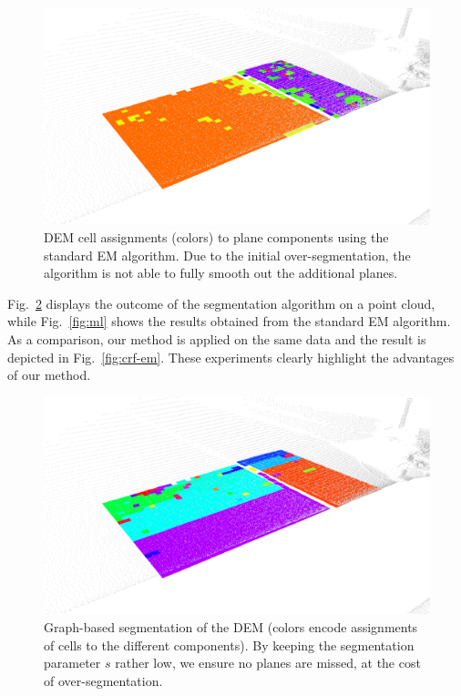 \begin{figure}[t]
\centering
\includegraphics[width=\columnwidth]{fig/ml.eps}
\caption{DEM cell assignments (colors) to plane components using the standard
EM algorithm. Due to the initial over-segmentation, the algorithm is not able
to fully smooth out the additional planes.}
\label{fig:complex}
\end{figure}

Fig.~\ref{fig:segment} displays the outcome of the segmentation algorithm on a
point cloud, while Fig.~\ref{fig:ml} shows the results obtained from the
standard EM algorithm. As a comparison, our method is applied on the same data
and the result is depicted in Fig.~\ref{fig:crf-em}. These experiments clearly
highlight the advantages of our method.

\begin{figure}[t]
\centering
\includegraphics[width=\columnwidth]{fig/segment.eps}
\caption{Graph-based segmentation of the DEM (colors encode assignments of
cells to the different components). By keeping the segmentation parameter $s$
rather low, we ensure no planes are missed, at the cost of over-segmentation.}
\label{fig:segment}
\end{figure}

